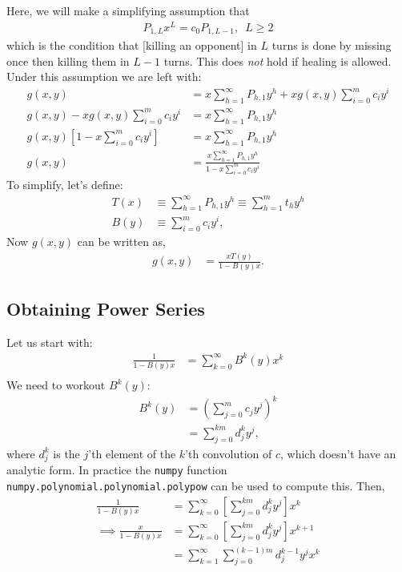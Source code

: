 		Here, we will make a simplifying assumption that
		\begin{align}
			P_{1, L}x^L = c_0P_{1, L-1},\,\,\,L\ge2
		\end{align}
		which is the condition that [killing an opponent] in $L$ turns is done by missing once then killing them in $L-1$ turns. This does \emph{not} hold if healing is allowed. Under this assumption we are left with:
		\begin{align}
			g(x, y) &= x\sum_{h=1}^\infty P_{h,1}y^h + xg(x, y)\sum_{i=0}^m c_iy^i\\
			g(x, y) - xg(x, y)\sum_{i=0}^m c_iy^i &= x\sum_{h=1}^\infty P_{h,1}y^h\\
			g(x, y)\left[1 - x\sum_{i=0}^m c_iy^i \right] &= x\sum_{h=1}^\infty P_{h,1}y^h\\
			g(x, y) &= \frac{x\sum_{h=1}^\infty P_{h,1}y^h}{1 - x\sum_{i=0}^m c_iy^i}
		\end{align}
		To simplify, let's define:
		\begin{align}
			T(x) &\equiv \sum_{h=1}^\infty P_{h, 1} y^h \equiv \sum_{h=1}^m t_h y^h \\
			B(y) &\equiv \sum_{i=0}^m c_i y^i,
		\end{align}
		Now $g(x, y)$ can be written as,
		\begin{align}
			g(x, y) &= \frac{xT(y)}{1- B(y)x}.
		\end{align}

		\subsection{Obtaining Power Series}

		Let us start with:
		\begin{align}
			\frac{1}{1- B(y)x} &= \sum_{k=0}^\infty B^k(y)x^k \\
		\end{align}
		We need to workout $B^k(y)$:
		\begin{align}
			B^k(y) &= \left( \sum_{j=0}^m c_j y^j\right)^k \\
			&= \sum_{j=0}^{km} d_j^k y^j,
		\end{align}
		where $d_j^k$ is the $j$'th element of the $k$'th convolution of $c$, which doesn't have an analytic form. In practice the \texttt{numpy} function \texttt{numpy.polynomial.polynomial.polypow} can be used to compute this. Then,
		\begin{align}
			\frac{1}{1-B(y)x} &= \sum_{k=0}^\infty \left[ \sum_{j=0}^{km} d_j^k y^j \right] x^k \\
			\implies\frac{x}{1-B(y)x} &= \sum_{k=0}^\infty \left[ \sum_{j=0}^{km} d_j^k y^j \right] x^{k+1} \\
			&= \sum_{k=1}^\infty \sum_{j=0}^{(k-1)m} d_j^{k-1} y^j x^k
		\end{align}

